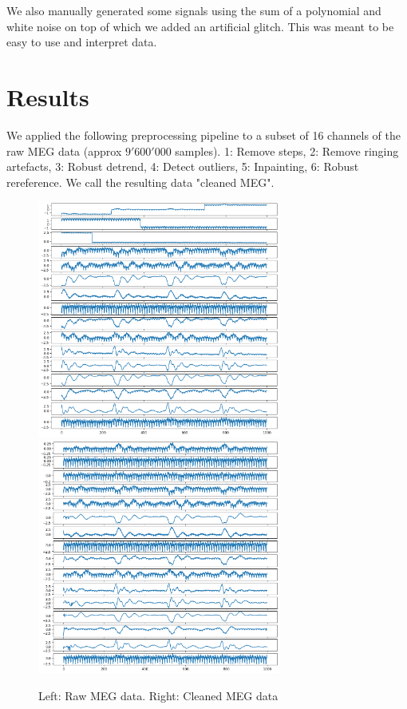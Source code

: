 \documentclass[11pt]{article}
\begin{document}
We also manually generated some signals using the sum of a polynomial and white noise on top of which we added an artificial glitch. This was meant to be easy to use and interpret data.\\ 

\section{Results}

We applied the following preprocessing pipeline to a subset of 16 channels of the raw MEG data (approx $9'600'000$ samples). 1: Remove steps, 2: Remove ringing artefacts, 3: Robust detrend, 4: Detect outliers, 5: Inpainting, 6: Robust rereference. We call the resulting data "cleaned MEG".

\begin{figure}
    \centering
    \includegraphics[width=8cm]{data_raw.png}%
    \includegraphics[width=8cm]{data_clean.png}
    \caption{Left: Raw MEG data. Right: Cleaned MEG data}
    \label{fig:data}
\end{figure}
\end{document}
